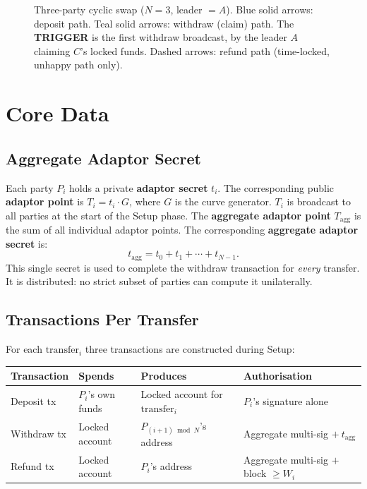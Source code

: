 \documentclass[11pt,a4paper,dvipsnames]{article}
\newcommand{\tagg}{t_{\mathrm{agg}}}
\newcommand{\Tagg}{T_{\mathrm{agg}}}
\begin{document}
\begin{figure}[h]
\caption{Three-party cyclic swap ($N=3$, leader $= A$).
  Blue solid arrows: deposit path.
  Teal solid arrows: withdraw (claim) path.
  The \textbf{TRIGGER} is the first withdraw broadcast, by the leader $A$
  claiming $C$'s locked funds.
  Dashed arrows: refund path (time-locked, unhappy path only).}
\label{fig:cycle}
\end{figure}

\section{Core Data}

\subsection{Aggregate Adaptor Secret}

Each party $P_i$ holds a private \textbf{adaptor secret} $t_i$.
The corresponding public \textbf{adaptor point} is $T_i = t_i \cdot G$,
where $G$ is the curve generator.
$T_i$ is broadcast to all parties at the start of the Setup phase.
The \textbf{aggregate adaptor point} $\Tagg$ is the sum of all individual
adaptor points. The corresponding \textbf{aggregate adaptor secret} is:
\[
  \tagg = t_0 + t_1 + \cdots + t_{N-1}.
\]
This single secret is used to complete the withdraw transaction for
\emph{every} transfer.
It is distributed: no strict subset of parties can compute it unilaterally.

\subsection{Transactions Per Transfer}

For each $\mathrm{transfer}_i$ three transactions are constructed during Setup:

\begin{center}
\renewcommand{\arraystretch}{1.3}
\begin{tabular}{@{}p{2.6cm}p{3cm}p{3.2cm}p{4.8cm}@{}}
\toprule
\textbf{Transaction} & \textbf{Spends} & \textbf{Produces} & \textbf{Authorisation} \\
\midrule
Deposit tx
  & $P_i$'s own funds
  & Locked account for $\mathrm{transfer}_i$
  & $P_i$'s signature alone \\[4pt]
Withdraw tx
  & Locked account
  & $P_{(i+1)\bmod N}$'s address
  & Aggregate multi-sig $+\ \tagg$ \\[4pt]
Refund tx
  & Locked account
  & $P_i$'s address
  & Aggregate multi-sig $+$ block $\geq W_i$ \\
\bottomrule
\end{tabular}
\end{center}
\end{document}
